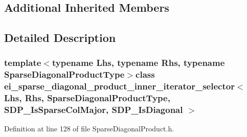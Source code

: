 \subsection*{Additional Inherited Members}


\subsection{Detailed Description}
\subsubsection*{template$<$typename Lhs, typename Rhs, typename Sparse\-Diagonal\-Product\-Type$>$class ei\-\_\-sparse\-\_\-diagonal\-\_\-product\-\_\-inner\-\_\-iterator\-\_\-selector$<$ Lhs, Rhs, Sparse\-Diagonal\-Product\-Type, S\-D\-P\-\_\-\-Is\-Sparse\-Col\-Major, S\-D\-P\-\_\-\-Is\-Diagonal $>$}



Definition at line 128 of file Sparse\-Diagonal\-Product.\-h.



